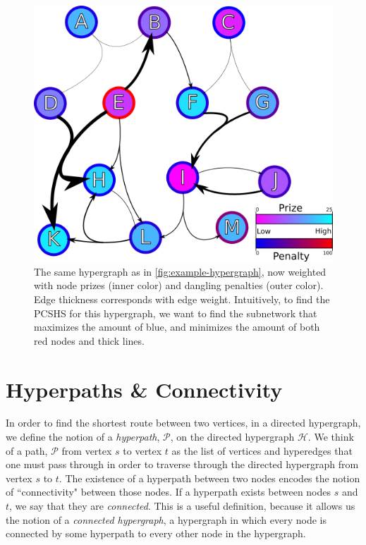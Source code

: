 \documentclass[12pt,twoside]{reedthesis}
\theoremstyle{definition}
\begin{document}
\begin{figure}[thbp]
  \begin{center}
    \includegraphics{example-hypergraph-weighted}
  \caption[A weighted hypergraph]{The same hypergraph as in \ref{fig:example-hypergraph}, now weighted with node prizes (inner color) and dangling penalties (outer color). Edge thickness corresponds with edge weight. Intuitively, to find the PCSHS for this hypergraph, we want to find the subnetwork that maximizes the amount of blue, and minimizes the amount of both red nodes and thick lines.}
  \label{fig:example-hypergraph-weighted}
  \end{center}
\end{figure}

\section{Hyperpaths \& Connectivity}
In order to find the shortest route between two vertices, in a directed hypergraph, we define the notion of a \textit{hyperpath}, $\mathcal{P}$, on the directed hypergraph $\mathcal{H}$.  We think of a path, $\mathcal{P}$ from vertex $s$ to vertex $t$ as the list of vertices and hyperedges that one must pass through in order to traverse through the directed hypergraph from vertex $s$ to $t$. The existence of a hyperpath between two nodes encodes the notion of ``connectivity" between those nodes.  If a hyperpath exists between nodes $s$ and $t$, we say that they are \textit{connected}. This is a useful definition, because it allows us the notion of a \textit{connected hypergraph}, a hypergraph in which every node is connected by some hyperpath to every other node in the hypergraph.\par
\end{document}
